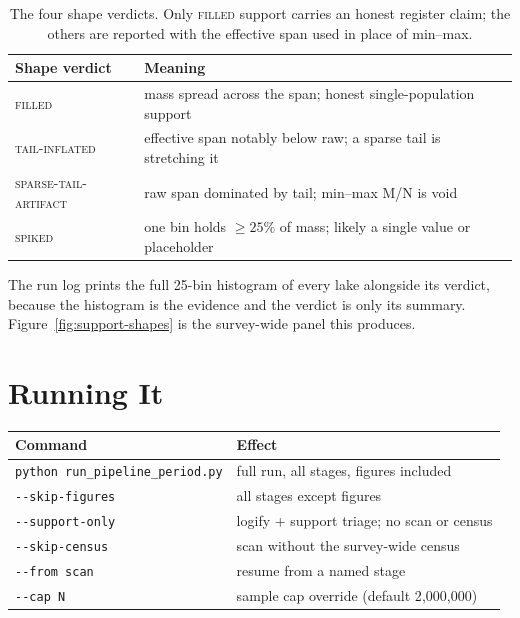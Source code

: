 \documentclass[11pt, letterpaper, openany]{book}
\begin{document}
\begin{table}[H]
\centering
\small
\begin{tabular}{@{}ll@{}}
\toprule
\textbf{Shape verdict} & \textbf{Meaning} \\
\midrule
\textsc{filled} & mass spread across the span; honest single-population support \\
\textsc{tail-inflated} & effective span notably below raw; a sparse tail is stretching it \\
\textsc{sparse-tail-artifact} & raw span dominated by tail; min--max M/N is void \\
\textsc{spiked} & one bin holds $\geq 25\%$ of mass; likely a single value or placeholder \\
\bottomrule
\end{tabular}
\caption{The four shape verdicts. Only \textsc{filled} support carries an honest register claim;
the others are reported with the effective span used in place of min--max.}
\end{table}

The run log prints the full 25-bin histogram of every lake alongside its verdict, because the
histogram is the evidence and the verdict is only its summary. Figure~\ref{fig:support-shapes}
is the survey-wide panel this produces.

\section{Running It}

\begin{table}[H]
\centering
\small
\begin{tabular}{@{}ll@{}}
\toprule
\textbf{Command} & \textbf{Effect} \\
\midrule
\texttt{python run\_pipeline\_period.py} & full run, all stages, figures included \\
\texttt{-{}-skip-figures} & all stages except figures \\
\texttt{-{}-support-only} & logify + support triage; no scan or census \\
\texttt{-{}-skip-census} & scan without the survey-wide census \\
\texttt{-{}-from scan} & resume from a named stage \\
\texttt{-{}-cap N} & sample cap override (default 2{,}000{,}000) \\
\bottomrule
\end{tabular}
\end{table}
\end{document}
